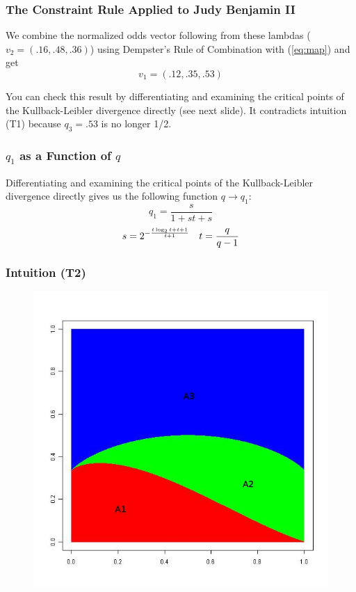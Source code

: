\documentclass[xcolor=dvipsnames]{beamer}
\begin{document}
\begin{frame}
  \frametitle{The Constraint Rule Applied to Judy Benjamin II}
  We combine the normalized odds vector following from these lambdas
  ($v_{2}=(.16,.48,.36)$) using Dempster's Rule of Combination with
  ({\ref{eq:map}}) and get
  \begin{displaymath}
    v_{1}=(.12,.35,.53)
  \end{displaymath}

  You can check this result by differentiating and examining the
  critical points of the Kullback-Leibler divergence directly (see
  next slide). It contradicts intuition (T1) because $q_{3}=.53$ is no
  longer 1/2.
\end{frame}

\begin{frame}
  \frametitle{$q_{1}$ as a Function of $q$}
  Differentiating and examining the critical points of the
  Kullback-Leibler divergence directly gives us the following function
  $q\rightarrow{}q_{1}$:
  \begin{displaymath}
q_{1}=\frac{s}{1+st+s}
\end{displaymath}
  \begin{align}
& s=2^{-\frac{t\log_{2}t+t+1}{t+1}}\notag
& t=\frac{q}{q-1}\notag
  \end{align}
\end{frame}

\begin{frame}
  \frametitle{Intuition (T2)}
  \begin{figure}[h]
    \includegraphics[scale=.4]{plot-i2.jpg}
  \end{figure}
\end{frame}
\end{document}
